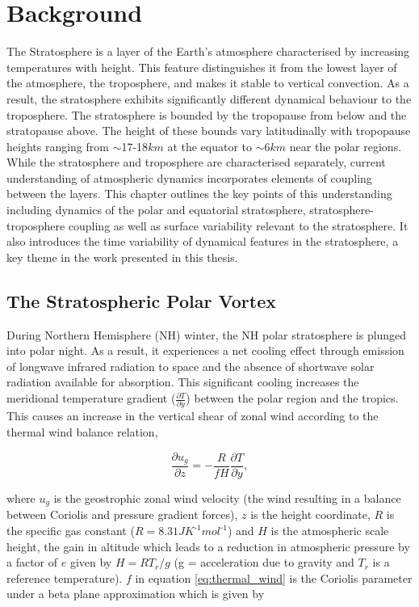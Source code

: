 \chapter{Background}
\label{cha:background}
The Stratosphere is a layer of the Earth's atmosphere characterised by increasing temperatures with height. This feature distinguishes it from the lowest layer of the atmosphere, the troposphere, and makes it stable to vertical convection. As a result, the stratosphere exhibits significantly different dynamical behaviour to the troposphere. The stratosphere is bounded by the tropopause from below and the stratopause above. The height of these bounds vary latitudinally with tropopause heights ranging from  $\sim$17-18$km$ at the equator to $\sim$6$km$ near the polar regions. While the stratosphere and troposphere are characterised separately, current understanding of atmospheric dynamics incorporates elements of coupling between the layers. This chapter outlines the key points of this understanding including dynamics of the polar and equatorial stratosphere, stratosphere-troposphere coupling as well as surface variability relevant to the stratosphere. It also introduces the time variability of dynamical features in the stratosphere, a key theme in the work presented in this thesis. 

\section{The Stratospheric Polar Vortex}
\label{sec:polar_vortex}
During Northern Hemisphere (NH) winter, the NH polar stratosphere is plunged into polar night. As a result, it experiences a net cooling effect through emission of longwave infrared radiation to space and the absence of shortwave solar radiation available for absorption. This significant cooling increases the meridional temperature gradient ($\frac{\partial T}{\partial y}$) between the polar region and the tropics. This causes an increase in the vertical shear of zonal wind according to the thermal wind balance relation,

\begin{equation} \label{eq:thermal_wind}
\frac{\partial u_g}{\partial z} = -\frac{R}{f H}\frac{\partial T}{\partial y},
\end{equation}

where $u_g$ is the geostrophic zonal wind velocity (the wind resulting in a balance between Coriolis and pressure gradient forces), $z$ is the height coordinate, $R$ is the specific gas constant ($R = 8.31JK^{\text{-} 1}mol^{\text{-} 1}$) and $H$ is the atmospheric scale height, the gain in altitude which leads to a reduction in atmospheric pressure by a factor of $e$ given by $H = RT_r/g$ (g = acceleration due to gravity and $T_r$ is a reference temperature). $f$ in equation \ref{eq:thermal_wind} is the Coriolis parameter under a beta plane approximation which is given by

